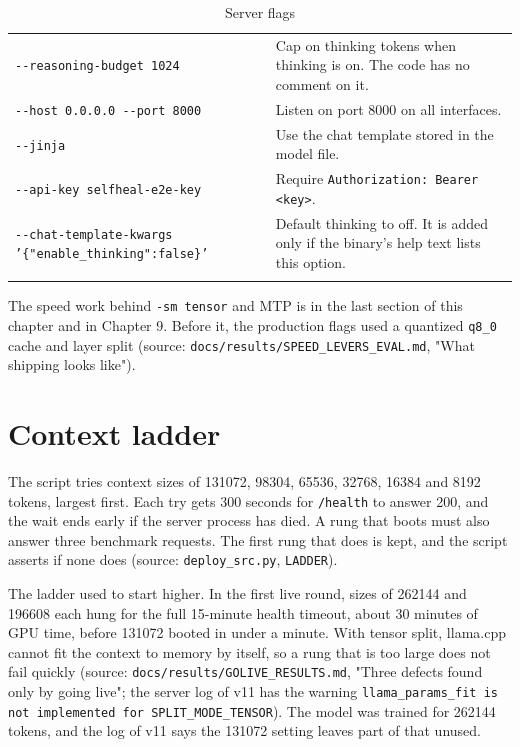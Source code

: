 \begin{longtable}{>{\raggedright\arraybackslash}p{0.439\dimexpr\linewidth-4\tabcolsep\relax}>{\raggedright\arraybackslash}p{0.561\dimexpr\linewidth-4\tabcolsep\relax}}
\texttt{-\allowbreak{}-\allowbreak{}reasoning-\allowbreak{}budget 1024} & Cap on thinking tokens when thinking is on. The code has no comment on it. \\
\texttt{-\allowbreak{}-\allowbreak{}host 0.\allowbreak{}0.\allowbreak{}0.\allowbreak{}0 -\allowbreak{}-\allowbreak{}port 8000} & Listen on port 8000 on all interfaces. \\
\texttt{-\allowbreak{}-\allowbreak{}jinja} & Use the chat template stored in the model file. \\
\texttt{-\allowbreak{}-\allowbreak{}api-\allowbreak{}key selfheal-\allowbreak{}e2e-\allowbreak{}key} & Require \texttt{Authorization:\allowbreak{} Bearer \textless{}key\textgreater{}}. \\
\texttt{-\allowbreak{}-\allowbreak{}chat-\allowbreak{}template-\allowbreak{}kwargs '\{"enable\_\allowbreak{}thinking":\allowbreak{}false\}'} & Default thinking to off. It is added only if the binary's help text lists this option. \\
\bottomrule
\caption{Server flags}\label{tab:07-1}\\
\end{longtable}
\endgroup

The speed work behind \texttt{-\allowbreak{}sm tensor} and MTP is in the last section of this chapter and in Chapter 9. Before it, the production flags used a quantized \texttt{q8\_\allowbreak{}0} cache and layer split (source: \texttt{docs/\allowbreak{}results/\allowbreak{}SPEED\_\allowbreak{}LEVERS\_\allowbreak{}EVAL.\allowbreak{}md}, "What shipping looks like").

\section{Context ladder}



The script tries context sizes of 131072, 98304, 65536, 32768, 16384 and 8192 tokens, largest first. Each try gets 300 seconds for \texttt{/\allowbreak{}health} to answer 200, and the wait ends early if the server process has died. A rung that boots must also answer three benchmark requests. The first rung that does is kept, and the script asserts if none does (source: \texttt{deploy\_\allowbreak{}src.\allowbreak{}py}, \texttt{LADDER}).

The ladder used to start higher. In the first live round, sizes of 262144 and 196608 each hung for the full 15-minute health timeout, about 30 minutes of GPU time, before 131072 booted in under a minute. With tensor split, llama.cpp cannot fit the context to memory by itself, so a rung that is too large does not fail quickly (source: \texttt{docs/\allowbreak{}results/\allowbreak{}GOLIVE\_\allowbreak{}RESULTS.\allowbreak{}md}, "Three defects found only by going live"; the server log of v11 has the warning \texttt{llama\_\allowbreak{}params\_\allowbreak{}fit is not implemented for SPLIT\_\allowbreak{}MODE\_\allowbreak{}TENSOR}). The model was trained for 262144 tokens, and the log of v11 says the 131072 setting leaves part of that unused.

